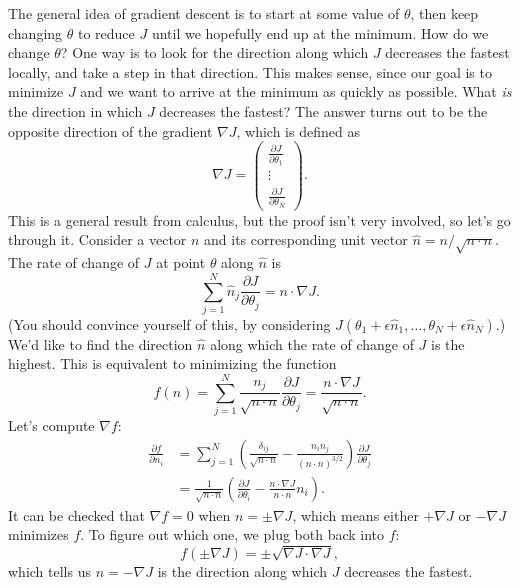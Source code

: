 \documentclass{article}
\theoremstyle{definition}
\begin{document}
The general idea of gradient descent is to start at some value of $\theta$, then keep changing $\theta$ to reduce $J$ until we hopefully end up at the minimum. How do we change $\theta$? One way is to look for the direction along which $J$ decreases the fastest locally, and take a step in that direction. This makes sense, since our goal is to minimize $J$ and we want to arrive at the minimum as quickly as possible. What \textit{is} the direction in which $J$ decreases the fastest? The answer turns out to be the opposite direction of the gradient $\nabla J$, which is defined as
\begin{equation}
    \nabla J =
    \begin{pmatrix}
        \frac{\partial J}{\partial \theta_1}\\
        \vdots\\
        \frac{\partial J}{\partial \theta_N}
    \end{pmatrix}.
\end{equation}
This is a general result from calculus, but the proof isn't very involved, so let's go through it. Consider a vector $n$ and its corresponding unit vector $\hat{n}=n/\sqrt{n\cdot n}$. The rate of change of $J$ at point $\theta$ along $\hat{n}$ is
\begin{equation*}
    \sum_{j=1}^N\hat{n}_j\frac{\partial J}{\partial\theta_j} = n \cdot \nabla J.
\end{equation*}
(You should convince yourself of this, by considering $J(\theta_1+\epsilon \hat{n}_1, \dots, \theta_N+\epsilon \hat{n}_N)$.) We'd like to find the direction $\hat{n}$ along which the rate of change of $J$ is the highest. This is equivalent to minimizing the function
\begin{equation*}
    f(n) = \sum_{j=1}^N\frac{n_j}{\sqrt{n\cdot n}}\frac{\partial J}{\partial\theta_j} = \frac{n\cdot \nabla J}{\sqrt{n\cdot n}}.
\end{equation*}
Let's compute $\nabla f$:
\begin{align}
    \frac{\partial f}{\partial n_i} &= \sum_{j=1}^N\left(\frac{\delta_{ij}}{\sqrt{n\cdot n}}-\frac{n_in_j}{(n\cdot n)^{3/2}}\right)\frac{\partial J}{\partial\theta_j}\\
    &= \frac{1}{\sqrt{n\cdot n}}\left(\frac{\partial J}{\partial\theta_i}-\frac{n\cdot \nabla J}{n\cdot n}n_i\right).
\end{align}
It can be checked that $\nabla f = 0$ when $n=\pm \nabla J$, which means either $+\nabla J$ or $-\nabla J$ minimizes $f$. To figure out which one, we plug both back into $f$:
\begin{equation*}
    f(\pm \nabla J) = \pm \sqrt{\nabla J \cdot \nabla J},
\end{equation*}
which tells us $n=-\nabla J$ is the direction along which $J$ decreases the fastest.
\end{document}
